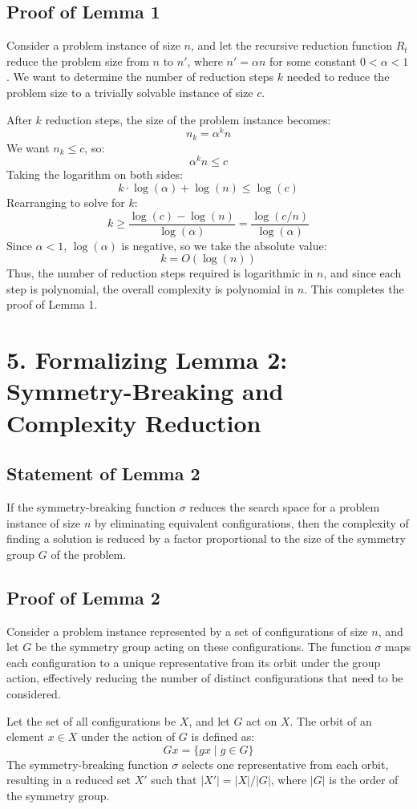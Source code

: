 \documentclass{article}
\begin{document}
\subsection*{Proof of Lemma 1}
Consider a problem instance of size $n$, and let the recursive reduction function $R_t$ reduce the problem size from $n$ to $n'$, where $n' = \alpha n$ for some constant $0 < \alpha < 1$. We want to determine the number of reduction steps $k$ needed to reduce the problem size to a trivially solvable instance of size $c$.

After $k$ reduction steps, the size of the problem instance becomes:
\[
    n_k = \alpha^k n
\]
We want $n_k \leq c$, so:
\[
    \alpha^k n \leq c
\]
Taking the logarithm on both sides:
\[
    k \cdot \log(\alpha) + \log(n) \leq \log(c)
\]
Rearranging to solve for $k$:
\[
    k \geq \frac{\log(c) - \log(n)}{\log(\alpha)} = \frac{\log(c/n)}{\log(\alpha)}
\]
Since $\alpha < 1$, $\log(\alpha)$ is negative, so we take the absolute value:
\[
    k = O(\log(n))
\]
Thus, the number of reduction steps required is logarithmic in $n$, and since each step is polynomial, the overall complexity is polynomial in $n$. This completes the proof of Lemma 1.

\section*{5. Formalizing Lemma 2: Symmetry-Breaking and Complexity Reduction}
\subsection*{Statement of Lemma 2}
If the symmetry-breaking function $\sigma$ reduces the search space for a problem instance of size $n$ by eliminating equivalent configurations, then the complexity of finding a solution is reduced by a factor proportional to the size of the symmetry group $G$ of the problem.

\subsection*{Proof of Lemma 2}
Consider a problem instance represented by a set of configurations of size $n$, and let $G$ be the symmetry group acting on these configurations. The function $\sigma$ maps each configuration to a unique representative from its orbit under the group action, effectively reducing the number of distinct configurations that need to be considered.

Let the set of all configurations be $X$, and let $G$ act on $X$. The orbit of an element $x \in X$ under the action of $G$ is defined as:
\[
    Gx = \{ gx \mid g \in G \}
\]
The symmetry-breaking function $\sigma$ selects one representative from each orbit, resulting in a reduced set $X'$ such that $|X'| = |X| / |G|$, where $|G|$ is the order of the symmetry group.
\end{document}
